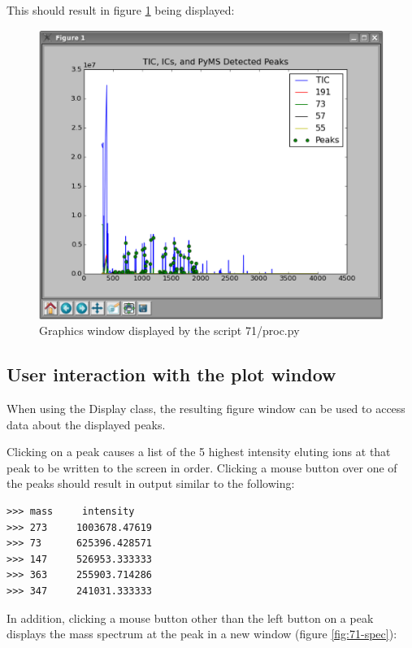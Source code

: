 This should result in figure \ref{fig:71-ics} being displayed:

\begin{figure}
  \begin{center}
    \includegraphics[scale=0.33]{graphics/chapter07/test-71-ICs.eps}
  \end{center}
  \caption{Graphics window displayed by the script 71/proc.py}
  \label{fig:71-ics}
\end{figure}

\subsection{User interaction with the plot window}

When using the Display class, the resulting figure window can be used to
access data about the displayed peaks.

Clicking on a peak causes a list of the 5 highest intensity eluting ions
at that peak to be written to the screen in order.  Clicking a mouse
 button over one of the peaks should result in output similar to the
following:

\begin{verbatim}
>>> mass     intensity
>>> 273     1003678.47619
>>> 73      625396.428571
>>> 147     526953.333333
>>> 363     255903.714286
>>> 347     241031.333333
\end{verbatim}

In addition, clicking a mouse button other than the left button on a peak
displays the mass spectrum at the peak in a new window (figure \ref{fig:71-spec}):

